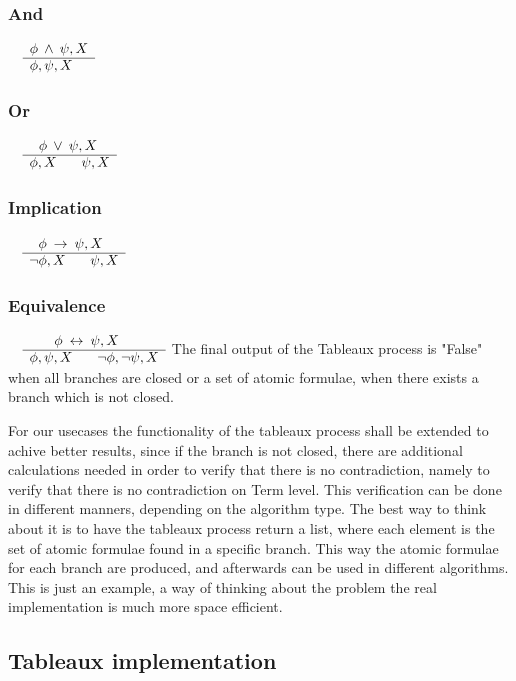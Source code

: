 \documentclass{article}
\begin{document}
		\subsubsection*{And}
			$\begin{array}{rl}
				& \phi \: \wedge \: \psi, X \\
			      \cline{2-2}
			      & \phi, \psi, X
			\end{array}$

		\subsubsection*{Or}
			$\begin{array}{rl}
				& \:\:\: \phi \: \vee \: \psi, X \\
			      \cline{2-2}
			      & \phi, X \:\:\:\:\:\:\:\: \psi, X
			\end{array}$

		\subsubsection*{Implication}
			$\begin{array}{rl}
				& \:\:\: \phi \: \rightarrow \: \psi, X \\
			      \cline{2-2}
			      & \neg\phi, X \:\:\:\:\:\:\:\: \psi, X
			\end{array}$

		\subsubsection*{Equivalence}
			$\begin{array}{rl}
				& \:\:\:\:\:\:\:\: \phi \: \leftrightarrow \: \psi, X \\
			      \cline{2-2}
			      & \phi, \psi, X \:\:\:\:\:\:\:\: \neg\phi, \neg \psi, X
			\end{array}$
	\newline
	\newline
	\newline
	The final output of the Tableaux process is "False" when all branches are closed or a set of atomic formulae, when there exists a branch which is not closed.
	\newline

	For our usecases the functionality of the tableaux process shall be extended to achive better results, since if the branch is not closed, there are 
	additional calculations needed in order to verify that there is no contradiction, namely to verify that there is no contradiction on Term level.
	This verification can be done in different manners, depending on the algorithm type. The best way to think about it is to have the tableaux process
	return a list, where each element is the set of atomic formulae found in a specific branch. This way the atomic formulae for each branch are produced, and 
	afterwards can be used in different algorithms. This is just an example, a way of thinking about the problem the real implementation is much more space 
	efficient.

	\subsection{Tableaux implementation}
	\newpage
\end{document}
